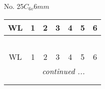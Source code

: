 \documentclass[fleqn,9pt,landscape]{jsarticle}
\begin{document}
\newpage
No. 25\quad$C_{6v}$\quad$6mm$\quad[ hexagonal ]
\begin{center}
\renewcommand{\arraystretch}{1.2}
\begin{longtable}{ccccccc}
 \hline \hline
WL & 1 & 2 & 3 & 4 & 5 & 6 \\ \hline \endfirsthead

\multicolumn{6}{l}{\tablename\ \thetable{}} \\
 \hline \hline
WL & 1 & 2 & 3 & 4 & 5 & 6 \\ \hline \endhead

 \hline \hline
\multicolumn{6}{r}{\footnotesize\it continued ...} \\ \endfoot

 \hline \hline
\multicolumn{6}{r}{} \\ \endlastfoot


\end{longtable}
\end{center}
\end{document}

